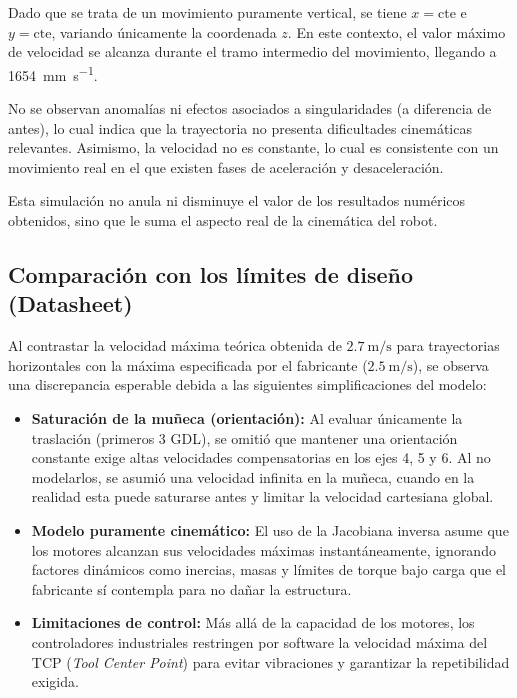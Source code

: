 Dado que se trata de un movimiento puramente vertical, se tiene $x = \text{cte}$ e $y = \text{cte}$, variando únicamente la coordenada $z$. En este contexto, el valor máximo de velocidad se alcanza durante el tramo intermedio del movimiento,
llegando a \SI{1654}{\milli\meter\per\second}.

No se observan anomalías ni efectos asociados a singularidades (a diferencia de antes), lo cual indica que la trayectoria no presenta dificultades cinemáticas relevantes. Asimismo, la velocidad no es constante, lo cual es consistente con un movimiento real en el que existen fases de aceleración y desaceleración.

Esta simulación no anula ni disminuye el valor de los resultados numéricos obtenidos, sino que le suma el aspecto real de la cinemática del robot.

\clearpage
\subsection{Comparación con los límites de diseño (Datasheet)}

Al contrastar la velocidad máxima teórica obtenida de $\qty{2.7}{\meter\per\second}$ para trayectorias horizontales con la máxima especificada por el fabricante ($\qty{2.5}{\meter\per\second}$), se observa una discrepancia esperable debida a las siguientes simplificaciones del modelo:

\begin{itemize}
	\item \textbf{Saturación de la muñeca (orientación):} Al evaluar únicamente la traslación (primeros 3 GDL), se omitió que mantener una orientación constante exige altas velocidades compensatorias en los ejes 4, 5 y 6. Al no modelarlos, se asumió una velocidad infinita en la muñeca, cuando en la realidad esta puede saturarse antes y limitar la velocidad cartesiana global.

	\item \textbf{Modelo puramente cinemático:} El uso de la Jacobiana inversa asume que los motores alcanzan sus velocidades máximas instantáneamente, ignorando factores dinámicos como inercias, masas y límites de torque bajo carga que el fabricante sí contempla para no dañar la estructura.

	\item \textbf{Limitaciones de control:} Más allá de la capacidad de los motores, los controladores industriales restringen por software la velocidad máxima del TCP (\textit{Tool Center Point}) para evitar vibraciones y garantizar la repetibilidad exigida.
\end{itemize}

\clearpage